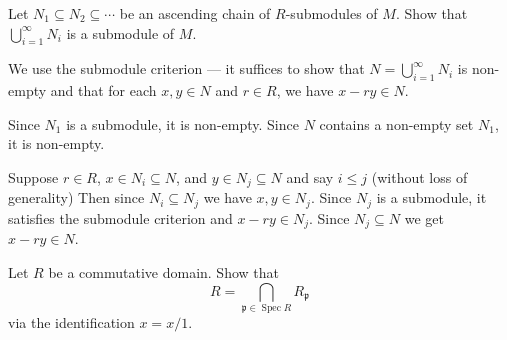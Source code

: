 \documentclass[12 pt, letterpaper]{hmcpset}
\begin{document}
\pagebreak

\begin{problem}[6.]
	Let $N_{1} \subseteq N_{2} \subseteq \cdots$ be an ascending chain of $R$-submodules of $M$. Show that $\bigcup_{i = 1}^{\infty} N_{i}$ is a submodule of $M$.
\end{problem}

\begin{solution}
	We use the submodule criterion --- it suffices to show that $N = \bigcup_{i = 1}^{\infty} N_{i}$ is non-empty and that for each $x, y \in N$ and $r \in R$, we have $x - r y \in N$.

	Since $N_{1}$ is a submodule, it is non-empty. Since $N$ contains a non-empty set $N_{1}$, it is non-empty.

	Suppose $r \in R$, $x \in N_{i} \subseteq N$, and $y \in N_{j} \subseteq N$ and say $i \le j$ (without loss of generality) Then since $N_{i} \subseteq N_{j}$ we have $x, y \in N_{j}$. Since $N_{j}$ is a submodule, it satisfies the submodule criterion and $x - r y \in N_{j}$. Since $N_{j} \subseteq N$ we get $x - r y \in N$.
\end{solution}

\pagebreak

\begin{problem}[7.]
	Let $R$ be a commutative domain. Show that
	\[
		R = \bigcap_{\mathfrak{p} \in \operatorname{Spec} R} R_{\mathfrak{p}}
	\]
	via the identification $x = x / 1$.
\end{problem}
\end{document}
